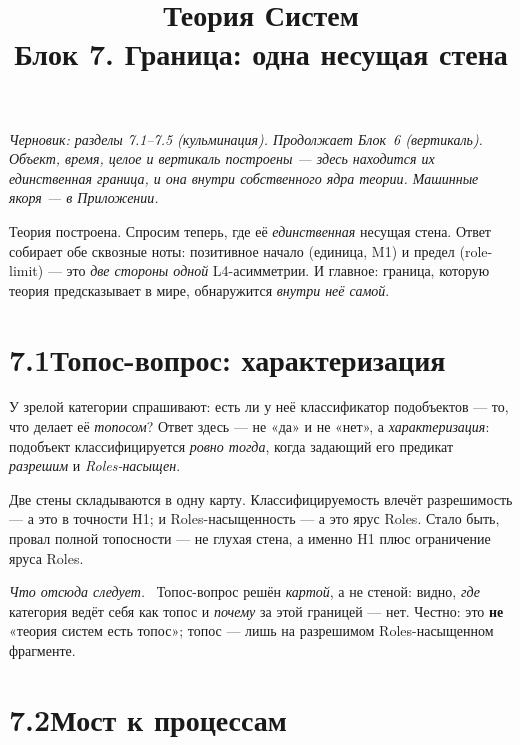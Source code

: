 \documentclass[12pt,a4paper]{article}
\title{\textbf{Теория Систем}\\[2mm]\large Блок 7. Граница: одна несущая стена}
\author{}
\date{}
\newcommand{\rezultat}{\medskip\noindent\emph{Что отсюда следует.}\ }
\begin{document}
\maketitle
\thispagestyle{empty}

\noindent\small\textit{Черновик: разделы 7.1--7.5 (кульминация). Продолжает Блок~6 (вертикаль).
Объект, время, целое и вертикаль построены --- здесь находится их \emph{единственная} граница, и
она внутри собственного ядра теории. Машинные якоря --- в Приложении.}\normalsize

\bigskip

\noindent Теория построена. Спросим теперь, где её \emph{единственная} несущая стена. Ответ собирает
обе сквозные ноты: позитивное начало (единица, M1) и предел (role-limit) --- это \emph{две стороны
одной} L4-асимметрии. И главное: граница, которую теория предсказывает в мире, обнаружится
\emph{внутри неё самой}.

\section*{7.1\quad Топос-вопрос: характеризация}

{\sloppy
У зрелой категории спрашивают: есть ли у неё классификатор подобъектов --- то, что делает её
\emph{топосом}? Ответ здесь --- не «да» и не «нет», а \emph{характеризация}: подобъект классифицируется
\emph{ровно тогда}, когда задающий его предикат \emph{разрешим} и \emph{Roles-насыщен}.

Две стены складываются в одну карту. Классифицируемость влечёт разрешимость --- а это в точности
H1; и Roles-насыщенность --- а это ярус Roles. Стало быть, провал полной топосности --- не глухая
стена, а именно H1 плюс ограничение яруса Roles.\par}

\rezultat
Топос-вопрос решён \emph{картой}, а не стеной: видно, \emph{где} категория ведёт себя как топос и
\emph{почему} за этой границей --- нет. Честно: это \textbf{не} «теория систем есть топос»; топос ---
лишь на разрешимом Roles-насыщенном фрагменте.

\section*{7.2\quad Мост к процессам}
\end{document}
